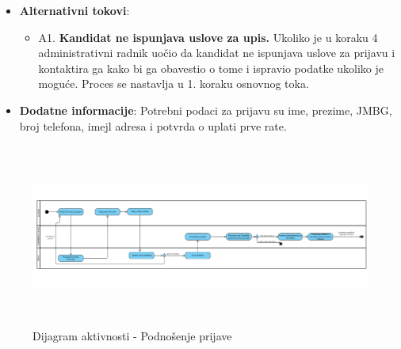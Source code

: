 \begin{itemize}
  \item \textbf{Alternativni tokovi}:
      \begin{itemize}
        \item A1. \textbf{Kandidat ne ispunjava uslove za upis.}
        Ukoliko je u koraku 4 administrativni radnik uočio da kandidat ne ispunjava uslove za prijavu i kontaktira ga kako bi ga obavestio o tome i ispravio podatke ukoliko je moguće. Proces se nastavlja u 1. koraku osnovnog toka.
      \end{itemize}

  \item \textbf{Dodatne informacije}:\newline
  Potrebni podaci za prijavu su ime, prezime, JMBG, broj telefona, imejl adresa i potvrda o uplati prve rate.
\end{itemize}

\begin{figure}[H]
  \begin{center}
      \includegraphics[width=130mm, height=60mm]{Diagrams/dijagram_aktivnosti_podnosenje_prijave.png}
  \end{center}
  \caption {Dijagram aktivnosti - Podnošenje prijave}
  \label{activity_podnosenje_zahteva_za_prijavu}

\end{figure}



